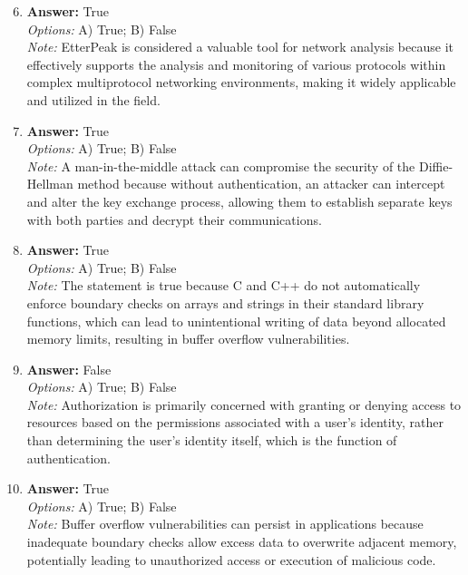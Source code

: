 \documentclass[12pt]{article}
\begin{document}
\begin{enumerate}[label=\arabic*.]
\setcounter{enumi}{5}
\item \textbf{Answer:} True
\\ \textit{Options:} A) True; B) False
\\ \textit{Note:} EtterPeak is considered a valuable tool for network analysis because it effectively supports the analysis and monitoring of various protocols within complex multiprotocol networking environments, making it widely applicable and utilized in the field.
\item \textbf{Answer:} True
\\ \textit{Options:} A) True; B) False
\\ \textit{Note:} A man-in-the-middle attack can compromise the security of the Diffie-Hellman method because without authentication, an attacker can intercept and alter the key exchange process, allowing them to establish separate keys with both parties and decrypt their communications.
\item \textbf{Answer:} True
\\ \textit{Options:} A) True; B) False
\\ \textit{Note:} The statement is true because C and C++ do not automatically enforce boundary checks on arrays and strings in their standard library functions, which can lead to unintentional writing of data beyond allocated memory limits, resulting in buffer overflow vulnerabilities.
\item \textbf{Answer:} False
\\ \textit{Options:} A) True; B) False
\\ \textit{Note:} Authorization is primarily concerned with granting or denying access to resources based on the permissions associated with a user's identity, rather than determining the user's identity itself, which is the function of authentication.
\item \textbf{Answer:} True
\\ \textit{Options:} A) True; B) False
\\ \textit{Note:} Buffer overflow vulnerabilities can persist in applications because inadequate boundary checks allow excess data to overwrite adjacent memory, potentially leading to unauthorized access or execution of malicious code.
\end{enumerate}
\end{document}
